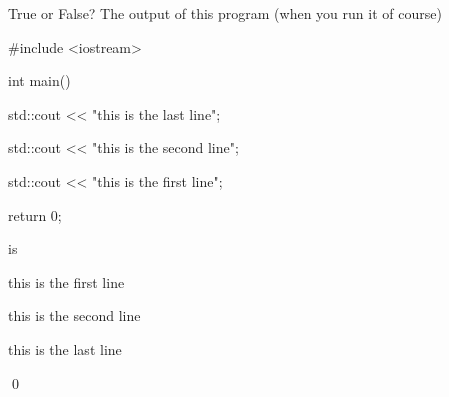 True or False? The output of this program (when you run it of course)

\begin{console}

#include <iostream>



int main()

{

    std::cout << "this is the last line\n";

    std::cout << "this is the second line\n";

    std::cout << "this is the first line\n";



    return 0;

}

\end{console}

is

\begin{console}

this is the first line

this is the second line

this is the last line

\end{console}

\qed

